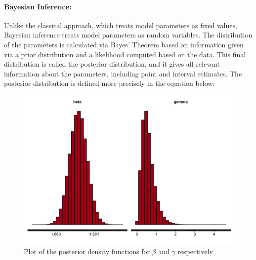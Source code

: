 \documentclass{article}
\begin{document}
\paragraph{Bayesian Inference:}


Unlike the classical approach, which treats model parameters as fixed values, Bayesian inference treats model parameters as random variables. The distribution of the parameters is calculated via Bayes' Theorem based on information given via a prior distribution and a likelihood computed based on the data. This final distribution is called the posterior distribution, and it gives all relevant information about the parameters, including point and interval estimates. The posterior distribution is defined more precisely in the equation below:

\begin{figure}[htbp]
\includegraphics[scale=.25, center]{ChainBinomBayesDensity.png}
\caption{Plot of the posterior density functions for $\beta$ and $\gamma$ respectively}
\label{fig:ChainBinomBayesDensity}
\end{figure}
\end{document}
